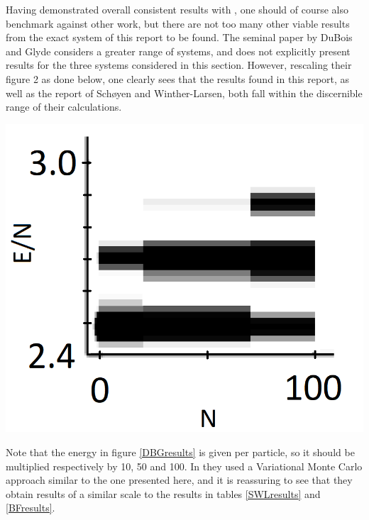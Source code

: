 \documentclass[a4paper,8pt]{article}
\begin{document}
\begin{multicols}{2}
Having demonstrated overall consistent results with \cite{SWL}, one should of course also benchmark against other work, but there are not too many other viable results from the exact system of this report to be found. The seminal paper by DuBois and Glyde\cite{DBG} considers a greater range of systems, and does not explicitly present results for the three systems considered in this section. However, rescaling their figure 2 as done below, one clearly sees that the results found in this report, as well as the report of Schøyen and Winther-Larsen\cite{SWL}, both fall within the discernible range of their calculations.

\begin{center}
\includegraphics[width=0.9\columnwidth]{DBG_results}
\label{DBGresults}
\end{center}

Note that the energy in figure \ref{DBGresults} is given per particle, so it should be multiplied respectively by 10, 50 and 100. In \cite{DBG} they used a Variational Monte Carlo approach similar to the one presented here, and it is reassuring to see that they obtain results of a similar scale to the results in tables \ref{SWLresults} and \ref{BFresults}.




\end{multicols}
\end{document}
